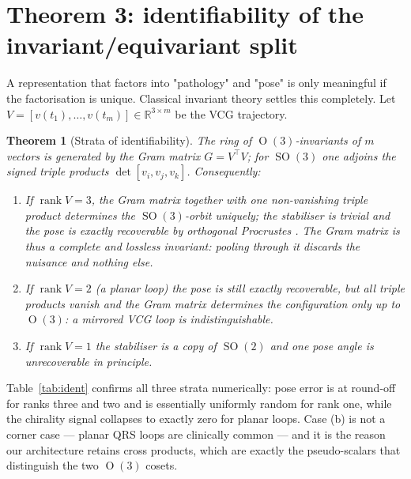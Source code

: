 \documentclass[11pt]{article}
\newtheorem{theorem}{Theorem}
\theoremstyle{definition}
\DeclareMathOperator{\SO}{SO}
\DeclareMathOperator{\Ortho}{O}
\DeclareMathOperator{\rank}{rank}
\newcommand{\R}{\mathbb{R}}
\begin{document}
\section{Theorem 3: identifiability of the invariant/equivariant split}\label{sec:ident}

A representation that factors into "pathology" and "pose" is only meaningful if the
factorisation is unique. Classical invariant theory settles this completely. Let
$V = [v(t_1),\dots,v(t_m)] \in \R^{3\times m}$ be the VCG trajectory.

\begin{theorem}[Strata of identifiability]\label{thm:ident}
The ring of $\Ortho(3)$-invariants of $m$ vectors is generated
\citep{weyl1946classical} by the Gram matrix
$G = V^{\top}V$; for $\SO(3)$ one adjoins the signed triple products
$\det[v_i,v_j,v_k]$. Consequently:
\begin{enumerate}\itemsep1pt
\item[(a)] If $\rank V = 3$, the Gram matrix together with one non-vanishing triple
  product determines the $\SO(3)$-orbit uniquely; the stabiliser is trivial and the
  pose is exactly recoverable by orthogonal Procrustes \citep{kabsch1976}. The Gram matrix is thus a \emph{complete and lossless}
  invariant: pooling through it discards the nuisance and nothing else.
\item[(b)] If $\rank V = 2$ (a planar loop) the pose is still exactly recoverable, but
  all triple products vanish and the Gram matrix determines the configuration only up
  to $\Ortho(3)$: a mirrored VCG loop is indistinguishable.
\item[(c)] If $\rank V = 1$ the stabiliser is a copy of $\SO(2)$ and one pose angle is
  unrecoverable in principle.
\end{enumerate}
\end{theorem}

Table~\ref{tab:ident} confirms all three strata numerically: pose error is at
round-off for ranks three and two and is essentially uniformly random for rank one,
while the chirality signal collapses to exactly zero for planar loops. Case (b) is not
a corner case --- planar QRS loops are clinically common --- and it is the reason our
architecture retains cross products, which are exactly the pseudo-scalars that
distinguish the two $\Ortho(3)$ cosets.

\begin{table}[t]\centering
\caption{Empirical confirmation of the three identifiability strata
(mean over 128 trials).}
\label{tab:ident}

\end{table}
\end{document}
